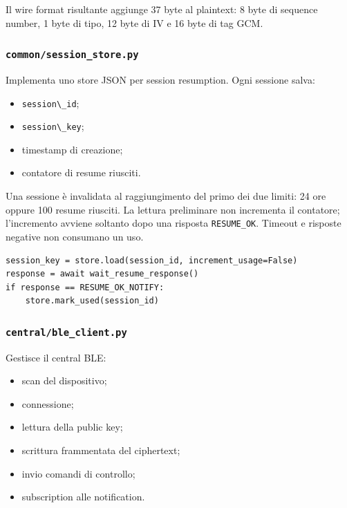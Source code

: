 \documentclass[11pt,a4paper]{article}
\providecommand{\tightlist}{\setlength{\itemsep}{0pt}\setlength{\parskip}{0pt}}
\newcommand{\passthrough}[1]{#1}
\begin{document}
Il wire format risultante aggiunge 37 byte al plaintext: 8 byte di
sequence number, 1 byte di tipo, 12 byte di IV e 16 byte di tag GCM.

\subsubsection{\texorpdfstring{\texttt{common/session\_store.py}}{common/session\_store.py}}\label{commonsession_store.py}

Implementa uno store JSON per session resumption. Ogni sessione salva:

\begin{itemize}
\tightlist
\item
  \passthrough{\lstinline!session\_id!};
\item
  \passthrough{\lstinline!session\_key!};
\item
  timestamp di creazione;
\item
  contatore di resume riusciti.
\end{itemize}

Una sessione è invalidata al raggiungimento del primo dei due limiti:
24 ore oppure 100 resume riusciti. La lettura preliminare non incrementa
il contatore; l'incremento avviene soltanto dopo una risposta
\texttt{RESUME\_OK}. Timeout e risposte negative non consumano un uso.

\begin{lstlisting}[style=pythonstyle,caption={Il contatore viene consumato solo dopo un resume accettato.}]
session_key = store.load(session_id, increment_usage=False)
response = await wait_resume_response()
if response == RESUME_OK_NOTIFY:
    store.mark_used(session_id)
\end{lstlisting}

\subsubsection{\texorpdfstring{\texttt{central/ble\_client.py}}{central/ble\_client.py}}\label{centralble_client.py}

Gestisce il central BLE:

\begin{itemize}
\tightlist
\item
  scan del dispositivo;
\item
  connessione;
\item
  lettura della public key;
\item
  scrittura frammentata del ciphertext;
\item
  invio comandi di controllo;
\item
  subscription alle notification.
\end{itemize}
\end{document}
